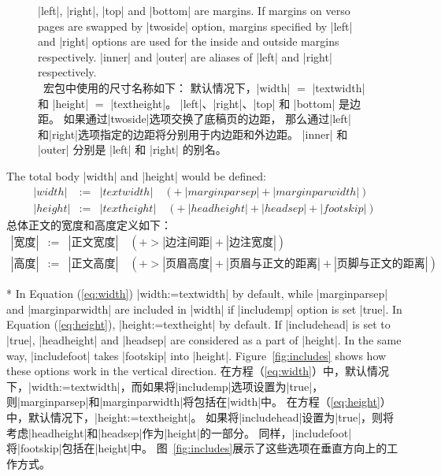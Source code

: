 \begin{figure}
{\begin{minipage}[t]{.8\textwidth}
 |left|, |right|, |top| and |bottom| are margins. 
 If margins on verso pages are swapped by |twoside| option,
 margins specified by |left| and |right| options
 are used for the inside and outside margins respectively.
 |inner| and |outer| are aliases of |left| and |right|
 respectively.\\
 \Gm\ 宏包中使用的尺寸名称如下：
默认情况下，|width| $=$ |textwidth| 和 |height| $=$ |textheight|。
|left|、|right|、|top| 和 |bottom| 是边距。
如果通过|twoside|选项交换了底稿页的边距，
那么通过|left|和|right|选项指定的边距将分别用于内边距和外边距。
|inner| 和 |outer| 分别是 |left| 和 |right| 的别名。
 \end{minipage}}
 \label{fig:layout}
\end{figure}

\begin{paracol}{2}
The total body |width| and |height| would be defined:
\begin{eqnarray}
\label{eq:width}
|width| &:=& |textwidth| \quad( +\>  |marginparsep| + |marginparwidth| )\\
|height| &:=& |textheight| \quad(+\> |headheight| + |headsep| + |footskip| )
\label{eq:height}
\end{eqnarray}
\switchcolumn
总体正文的宽度和高度定义如下：
\begin{eqnarray}
\label{eq:width}
|宽度| &:=& |正文宽度| \quad( +> |边注间距| + |边注宽度| )\\
|高度| &:=& |正文高度| \quad(+> |页眉高度| + |页眉与正文的距离| + |页脚与正文的距离| )
\label{eq:height}
\end{eqnarray}

\switchcolumn[0]*
In Equation (\ref{eq:width}) |width:=textwidth| by default, 
while |marginparsep| and |marginparwidth| are included in |width|
if |includemp| option is set |true|. 
In Equation (\ref{eq:height}), |height:=textheight| by default. 
If |includehead| is set to |true|, |headheight| and |headsep| are
considered as a part of |height|.
In the same way, |includefoot| takes |footskip| into |height|. 
Figure~\ref{fig:includes} shows how these options
work in the vertical direction.
\switchcolumn
在方程（\ref{eq:width}）中，默认情况下，|width:=textwidth|，而如果将|includemp|选项设置为|true|，则|marginparsep|和|marginparwidth|将包括在|width|中。
在方程（\ref{eq:height}）中，默认情况下，|height:=textheight|。
如果将|includehead|设置为|true|，则将考虑|headheight|和|headsep|作为|height|的一部分。
同样，|includefoot|将|footskip|包括在|height|中。
图~\ref{fig:includes}展示了这些选项在垂直方向上的工作方式。
\end{paracol}

